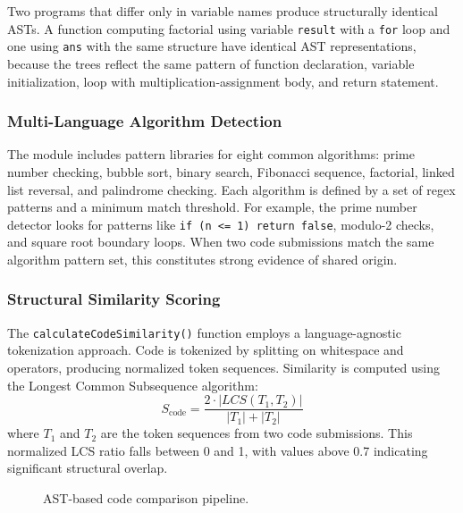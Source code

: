 \documentclass[10pt,twocolumn]{article}
\begin{document}
Two programs that differ only in variable names produce structurally identical ASTs. A function computing factorial using variable \texttt{result} with a \texttt{for} loop and one using \texttt{ans} with the same structure have identical AST representations, because the trees reflect the same pattern of function declaration, variable initialization, loop with multiplication-assignment body, and return statement.

\subsubsection{Multi-Language Algorithm Detection}
The module includes pattern libraries for eight common algorithms: prime number checking, bubble sort, binary search, Fibonacci sequence, factorial, linked list reversal, and palindrome checking. Each algorithm is defined by a set of regex patterns and a minimum match threshold. For example, the prime number detector looks for patterns like \texttt{if (n <= 1) return false}, modulo-2 checks, and square root boundary loops. When two code submissions match the same algorithm pattern set, this constitutes strong evidence of shared origin.

\subsubsection{Structural Similarity Scoring}
The \texttt{calculateCodeSimilarity()} function employs a language-agnostic tokenization approach. Code is tokenized by splitting on whitespace and operators, producing normalized token sequences. Similarity is computed using the Longest Common Subsequence algorithm:
\begin{equation}
S_{\text{code}} = \frac{2 \cdot |LCS(T_1, T_2)|}{|T_1| + |T_2|}
\end{equation}
where $T_1$ and $T_2$ are the token sequences from two code submissions. This normalized LCS ratio falls between 0 and 1, with values above 0.7 indicating significant structural overlap.

\begin{figure}[htbp]
\centering
\vspace{4.5cm}
\caption{AST-based code comparison pipeline.}
\label{fig:ast}
\end{figure}
\end{document}
